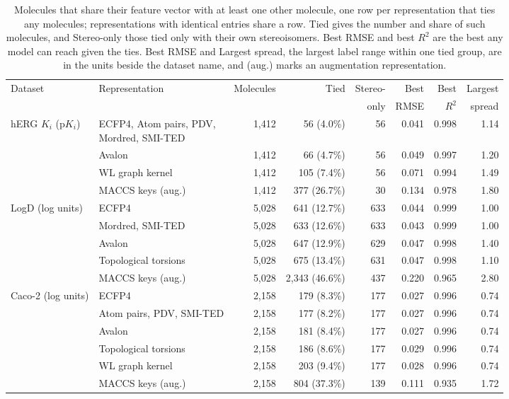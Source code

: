 \begin{table}[htbp]
\centering
\small
\setlength{\tabcolsep}{4pt}
\begin{adjustbox}{max width=\textwidth,max totalheight=0.78\textheight}
\begin{tabular}{llrrrrrr}
\toprule
Dataset & Representation & Molecules & Tied & Stereo- & Best & Best & Largest \\
 & & & & only & RMSE & $R^2$ & spread \\
\midrule
hERG $K_i$ (p$K_i$) & \makecell[l]{ECFP4, Atom pairs, PDV,\\Mordred, SMI-TED} & 1,412 & 56 (4.0\%) & 56 & 0.041 & 0.998 & 1.14 \\
 & Avalon & 1,412 & 66 (4.7\%) & 56 & 0.049 & 0.997 & 1.20 \\
 & WL graph kernel & 1,412 & 105 (7.4\%) & 56 & 0.071 & 0.994 & 1.49 \\
 & MACCS keys (aug.) & 1,412 & 377 (26.7\%) & 30 & 0.134 & 0.978 & 1.80 \\
\midrule
LogD (log units) & ECFP4 & 5,028 & 641 (12.7\%) & 633 & 0.044 & 0.999 & 1.00 \\
 & Mordred, SMI-TED & 5,028 & 633 (12.6\%) & 633 & 0.043 & 0.999 & 1.00 \\
 & Avalon & 5,028 & 647 (12.9\%) & 629 & 0.047 & 0.998 & 1.40 \\
 & Topological torsions & 5,028 & 675 (13.4\%) & 631 & 0.047 & 0.998 & 1.10 \\
 & MACCS keys (aug.) & 5,028 & 2,343 (46.6\%) & 437 & 0.220 & 0.965 & 2.80 \\
\midrule
Caco-2 (log units) & ECFP4 & 2,158 & 179 (8.3\%) & 177 & 0.027 & 0.996 & 0.74 \\
 & Atom pairs, PDV, SMI-TED & 2,158 & 177 (8.2\%) & 177 & 0.027 & 0.996 & 0.74 \\
 & Avalon & 2,158 & 181 (8.4\%) & 177 & 0.027 & 0.996 & 0.74 \\
 & Topological torsions & 2,158 & 186 (8.6\%) & 177 & 0.029 & 0.996 & 0.74 \\
 & WL graph kernel & 2,158 & 203 (9.4\%) & 177 & 0.028 & 0.996 & 0.74 \\
 & MACCS keys (aug.) & 2,158 & 804 (37.3\%) & 139 & 0.111 & 0.935 & 1.72 \\
\bottomrule
\end{tabular}
\end{adjustbox}

\caption[Molecules that share a feature vector with another molecule.]{Molecules that share their feature vector with at least one other molecule, one row per representation that ties any molecules; representations with identical entries share a row. Tied gives the number and share of such molecules, and Stereo-only those tied only with their own stereoisomers. Best RMSE and best $R^2$ are the best any model can reach given the ties. Best RMSE and Largest spread, the largest label range within one tied group, are in the units beside the dataset name, and (aug.) marks an augmentation representation.}
\label{tab:flaws:ties}
\end{table}

